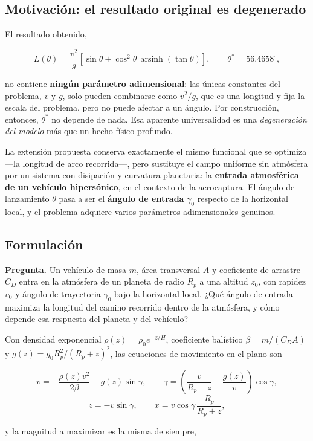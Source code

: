 \subsection{Motivación: el resultado original es degenerado}

El resultado obtenido,

\[
L(\theta)=\frac{v^2}{g}\left[\sin\theta+\cos^2\theta\,\operatorname{arsinh}(\tan\theta)\right],
\qquad
\theta^*=56.4658^\circ,
\]

no contiene \textbf{ningún parámetro adimensional}: las únicas constantes del problema, \(v\) y \(g\), solo pueden combinarse como \(v^2/g\), que es una longitud y fija la escala del problema, pero no puede afectar a un ángulo. Por construcción, entonces, \(\theta^*\) no depende de nada. Esa aparente universalidad es una \emph{degeneración del modelo} más que un hecho físico profundo.

La extensión propuesta conserva exactamente el mismo funcional que se optimiza ---la longitud de arco recorrida---, pero sustituye el campo uniforme sin atmósfera por un sistema con disipación y curvatura planetaria: la \textbf{entrada atmosférica de un vehículo hipersónico}, en el contexto de la aerocaptura. El ángulo de lanzamiento \(\theta\) pasa a ser el \textbf{ángulo de entrada} \(\gamma_0\) respecto de la horizontal local, y el problema adquiere varios parámetros adimensionales genuinos.

\subsection{Formulación}

\textbf{Pregunta.} Un vehículo de masa \(m\), área transversal \(A\) y coeficiente de arrastre \(C_D\) entra en la atmósfera de un planeta de radio \(R_p\) a una altitud \(z_0\), con rapidez \(v_0\) y ángulo de trayectoria \(\gamma_0\) bajo la horizontal local. ¿Qué ángulo de entrada maximiza la longitud del camino recorrido dentro de la atmósfera, y cómo depende esa respuesta del planeta y del vehículo?

Con densidad exponencial \(\rho(z)=\rho_0e^{-z/H}\), coeficiente balístico \(\beta=m/(C_DA)\) y \(g(z)=g_0R_p^2/(R_p+z)^2\), las ecuaciones de movimiento en el plano son

\[
\dot v=-\frac{\rho(z)v^2}{2\beta}-g(z)\sin\gamma,
\qquad
\dot\gamma=\left(\frac{v}{R_p+z}-\frac{g(z)}{v}\right)\cos\gamma,
\]
\[
\dot z=-v\sin\gamma,
\qquad
\dot x=v\cos\gamma\,\frac{R_p}{R_p+z},
\]

y la magnitud a maximizar es la misma de siempre,

